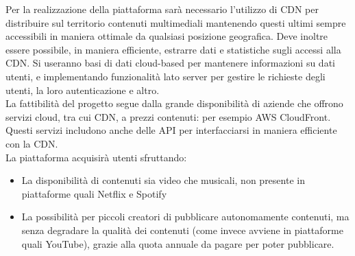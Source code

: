 Per la realizzazione della piattaforma sarà necessario l'utilizzo di CDN per distribuire sul territorio contenuti multimediali mantenendo questi ultimi sempre accessibili in maniera ottimale da qualsiasi posizione geografica. Deve inoltre essere possibile, in maniera efficiente, estrarre dati e statistiche sugli accessi alla CDN. Si useranno basi di dati cloud-based per mantenere informazioni su dati utenti, e implementando funzionalità lato server per gestire le richieste degli utenti, la loro autenticazione e altro.\\

La fattibilità del progetto segue dalla grande disponibilità di aziende che offrono servizi cloud, tra cui CDN, a prezzi contenuti: per esempio AWS CloudFront. Questi servizi includono anche delle API per interfacciarsi in maniera efficiente con la CDN.\\

La piattaforma acquisirà utenti sfruttando:
    \begin{itemize}
    \item La disponibilità di contenuti sia video che musicali, non presente in piattaforme quali Netflix e Spotify    
    \item La possibilità per piccoli creatori di pubblicare autonomamente contenuti, ma senza degradare la qualità dei contenuti (come invece avviene in piattaforme quali YouTube), grazie alla quota annuale da pagare per poter pubblicare.
\end{itemize}
